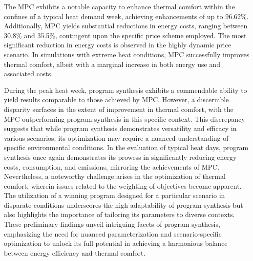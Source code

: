 The MPC exhibits a notable capacity to enhance thermal comfort within the confines of a typical heat demand week, achieving enhancements of up to 96.62\%. Additionally, MPC yields substantial reductions in energy costs, ranging between 30.8\% and 35.5\%, contingent upon the specific price scheme employed. The most significant reduction in energy costs is observed in the highly dynamic price scenario. In simulations with extreme heat conditions, MPC successfully improves thermal comfort, albeit with a marginal increase in both energy use and associated costs.

During the peak heat week, program synthesis exhibits a commendable ability to yield results comparable to those achieved by MPC. However, a discernible disparity surfaces in the extent of improvement in thermal comfort, with the MPC outperforming program synthesis in this specific context. This discrepancy suggests that while program synthesis demonstrates versatility and efficacy in various scenarios, its optimization may require a nuanced understanding of specific environmental conditions. In the evaluation of typical heat days, program synthesis once again demonstrates its prowess in significantly reducing energy costs, consumption, and emissions, mirroring the achievements of MPC. Nevertheless, a noteworthy challenge arises in the optimization of thermal comfort, wherein issues related to the weighting of objectives become apparent. The utilization of a winning program designed for a particular scenario in disparate conditions underscores the high adaptability of program synthesis but also highlights the importance of tailoring its parameters to diverse contexts. These preliminary findings unveil intriguing facets of program synthesis, emphasizing the need for nuanced parameterization and scenario-specific optimization to unlock its full potential in achieving a harmonious balance between energy efficiency and thermal comfort.

